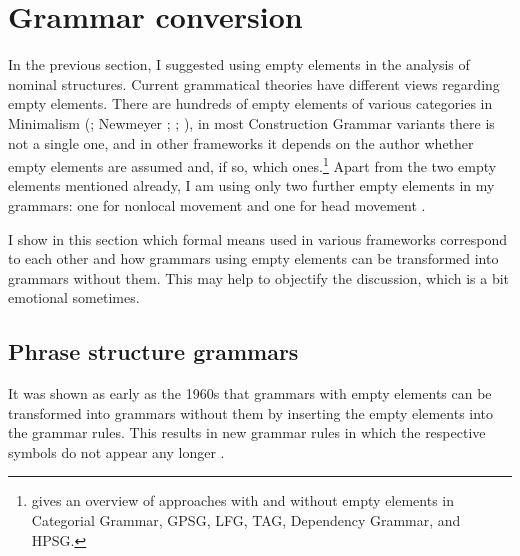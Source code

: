 \documentclass[output=paper
  ,nobabel
  ,draftmode
  ,uniformtopskip %
  ,colorlinks, citecolor=brown
]{langscibook}
\begin{document}
\section{Grammar conversion}
\label{sec-grammatikkonversion}\label{sec-grammar-conversion}


In the previous section, I suggested using empty elements in the analysis of nominal
structures. Current grammatical theories have different views regarding empty elements. There are
hundreds of empty elements of various categories in Minimalism (\citealt[]{Webelhuth95a}; Newmeyer \citeyear[]{Newmeyer2004b};
  \citeyear[]{Newmeyer2005a}; \citealt[Section~4.6.1.1]{MuellerGT-Eng4}), in most
  Construction Grammar variants there is not a single one, and in other frameworks it depends on the
  author whether empty elements are assumed and, if so, which ones.\footnote{%
     gives an overview of approaches with and without empty
    elements in Categorial Grammar, GPSG, LFG, TAG, Dependency Grammar, and HPSG.
} Apart from the two empty elements mentioned
already, I am using only two further empty elements in my grammars: one for nonlocal movement and
one for head movement \citep{MuellerLehrbuch3,MuellerGS}.

I show in this section which formal means used in various frameworks correspond to each other and
how grammars using empty elements can be transformed into grammars without them. This may help to
objectify the discussion, which is a bit emotional sometimes.

\subsection{Phrase structure grammars}
\label{sec-psg}

It was shown as early as the 1960s that grammars with empty elements can be transformed into
grammars without them by inserting the empty elements into the grammar rules. This results in new
grammar rules in which the respective symbols do not appear any longer \citep{BHPS61a,Mueller2004e}.
\end{document}
